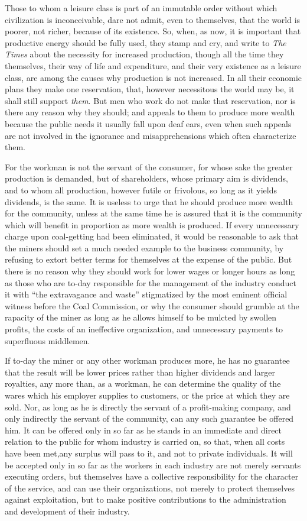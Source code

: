 \documentclass{book}
\begin{document}
Those to whom a leisure class is part of an immutable order without which civilization is inconceivable, dare not admit, even to themselves, that the world is poorer, not richer, because of its existence. So, when, as now, it is important that productive energy should be fully used, they stamp and cry, and write to \emph{The Times} about the necessity for increased production, though all the time they themselves, their way of life and expenditure, and their very existence as a leisure class, are among the causes why production is not increased. In all their economic plans they make one reservation, that, however necessitous the world may be, it shall still support \emph{them}. But men who work do not make that reservation, nor is there any reason why they should; and appeals to them to produce more wealth because the public needs it usually fall upon deaf ears, even when such appeals are not involved in the ignorance and misapprehensions which often characterize them.

For the workman is not the servant of the consumer, for whose sake the greater production is demanded, but of shareholders, whose primary aim is dividends, and to whom all production, however futile or frivolous, so long as it yields dividends, is the same. It is useless to urge that he should produce more wealth for the community, unless at the same time he is assured that it is the community which will benefit in proportion as more wealth is produced. If every unnecessary charge upon coal-getting had been eliminated, it would be reasonable to ask that the miners should set a much needed example to the business community, by refusing to extort better terms for themselves at the expense of the public. But there is no reason why they should work for lower wages or longer hours as long as those who are to-day responsible for the management of the industry conduct it with “the extravagance and waste” stigmatized by the most eminent official witness before the Coal Commission, or why the consumer should grumble at the rapacity of the miner as long as he allows himself to be mulcted by swollen profits, the costs of an ineffective organization, and unnecessary payments to superfluous middlemen.

If to-day the miner or any other workman produces more, he has no guarantee that the result will be lower prices rather than higher dividends and larger royalties, any more than, as a workman, he can determine the quality of the wares which his employer supplies to customers, or the price at which they are sold. Nor, as long as he is directly the servant of a profit-making company, and only indirectly the servant of the community, can any such guarantee be offered him. It can be offered only in so far as he stands in an immediate and direct relation to the public for whom industry is carried on, so that, when all costs have been met,any surplus will pass to it, and not to private individuals. It will be accepted only in so far as the workers in each industry are not merely servants executing orders, but themselves have a collective responsibility for the character of the service, and can use their organizations, not merely to protect themselves against exploitation, but to make positive contributions to the administration and development of their industry.
\end{document}
